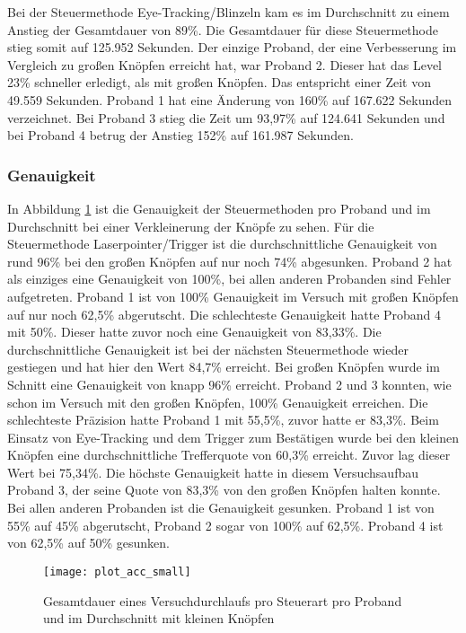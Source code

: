 Bei der Steuermethode Eye-Tracking/Blinzeln kam es im Durchschnitt zu einem Anstieg der Gesamtdauer von 89\%. Die Gesamtdauer für diese Steuermethode stieg somit auf 125.952 Sekunden. Der einzige Proband, der eine Verbesserung im Vergleich zu großen Knöpfen erreicht hat, war Proband 2. Dieser hat das Level 23\% schneller erledigt, als mit großen Knöpfen. Das entspricht einer Zeit von 49.559 Sekunden. Proband 1 hat eine Änderung von 160\% auf 167.622 Sekunden verzeichnet. Bei Proband 3 stieg die Zeit um 93,97\% auf 124.641 Sekunden und bei Proband 4 betrug der Anstieg 152\% auf 161.987 Sekunden. 

\subsubsection{Genauigkeit}
In Abbildung \ref{fig:totalACCsmall} ist die Genauigkeit der Steuermethoden pro Proband und im Durchschnitt bei einer Verkleinerung der Knöpfe zu sehen. Für die Steuermethode Laserpointer/Trigger ist die durchschnittliche Genauigkeit von rund 96\% bei den großen Knöpfen auf nur noch 74\% abgesunken. Proband 2 hat als einziges eine Genauigkeit von 100\%, bei allen anderen Probanden sind Fehler aufgetreten. Proband 1 ist von 100\% Genauigkeit im Versuch mit großen Knöpfen auf nur noch 62,5\% abgerutscht. Die schlechteste Genauigkeit hatte Proband 4 mit 50\%. Dieser hatte zuvor noch eine Genauigkeit von 83,33\%. Die durchschnittliche Genauigkeit ist bei der nächsten Steuermethode wieder gestiegen und hat hier den Wert 84,7\% erreicht. Bei großen Knöpfen wurde im Schnitt eine Genauigkeit von knapp 96\% erreicht. Proband 2 und 3 konnten, wie schon im Versuch mit den großen Knöpfen, 100\% Genauigkeit erreichen. Die schlechteste Präzision hatte Proband 1 mit 55,5\%, zuvor hatte er 83,3\%. Beim Einsatz von Eye-Tracking und dem Trigger zum Bestätigen wurde bei den kleinen Knöpfen eine durchschnittliche Trefferquote von 60,3\% erreicht. Zuvor lag dieser Wert bei 75,34\%. Die höchste Genauigkeit hatte in diesem Versuchsaufbau Proband 3, der seine Quote von 83,3\% von den großen Knöpfen halten konnte. Bei allen anderen Probanden ist die Genauigkeit gesunken. Proband 1 ist von 55\% auf 45\% abgerutscht, Proband 2 sogar von 100\% auf 62,5\%. Proband 4 ist von 62,5\% auf 50\% gesunken.

\begin{figure}[!htbp]
	\centering
	\texttt{[image: plot\_acc\_small]}
	\caption[Gesamtdauer eines Versuchdurchlaufs pro Steuerart pro Proband und im Durchschnitt mit kleinen Knöpfen]{Gesamtdauer eines Versuchdurchlaufs pro Steuerart pro Proband und im Durchschnitt mit kleinen Knöpfen}
	\label{fig:totalACCsmall}
\end{figure}

